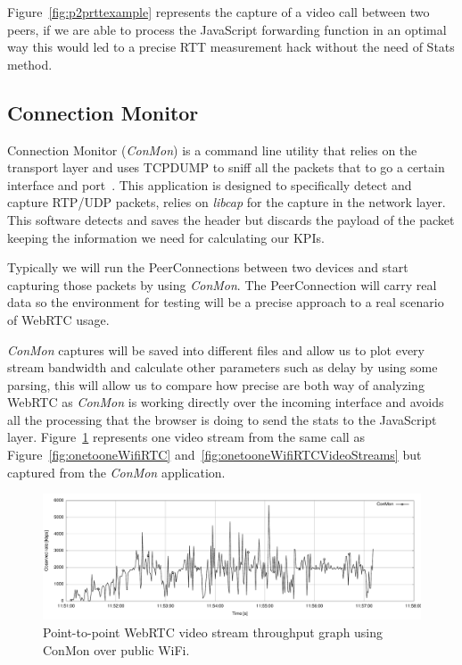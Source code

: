 Figure~\ref{fig:p2prttexample} represents the capture of a video call between two peers, if we are able to process the JavaScript forwarding function in an optimal way this would led to a precise RTT measurement hack without the need of Stats method.

\subsection{Connection Monitor}

Connection Monitor ({\it ConMon}) is a command line utility that relies on the transport layer and uses TCPDUMP to sniff all the packets that to go a certain interface and port~\cite{singhConMon}. This application is designed to specifically detect and capture RTP/UDP packets, relies on {\it libcap} for the capture in the network layer. This software detects and saves the header but discards the payload of the packet keeping the information we need for calculating our KPIs.

Typically we will run the PeerConnections between two devices and start capturing those packets by using {\it ConMon}. The PeerConnection will carry real data so the environment for testing will be a precise approach to a real scenario of WebRTC usage.

{\it ConMon} captures will be saved into different files and allow us to plot every stream bandwidth and calculate other parameters such as delay by using some parsing, this will allow us to compare how precise are both way of analyzing WebRTC as {\it ConMon} is working directly over the incoming interface and avoids all the processing that the browser is doing to send the stats to the JavaScript layer. Figure~\ref{fig:onetooneWifiRTCConMon} represents one video stream from the same call as Figure~\ref{fig:onetooneWifiRTC} and~\ref{fig:onetooneWifiRTCVideoStreams} but captured from the {\it ConMon} application.

 \begin{figure}[h]
  \centering
    \includegraphics[width=1\textwidth]{./figures/onetooneWiFiConMon.pdf}
      \caption[Point-to-point WebRTC video stream throughput graph using ConMon over public WiFi]{Point-to-point WebRTC video stream throughput graph using ConMon over public WiFi.}
	\label{fig:onetooneWifiRTCConMon}
\end{figure}

